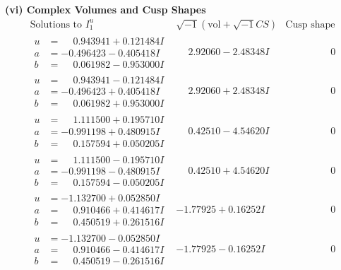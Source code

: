 \documentclass[1p]{elsarticle_modified}
\theoremstyle{definition}
\newcommand{\I}{\sqrt{-1}}
\begin{document}
\newpage\flushleft \textbf{(vi) Complex Volumes and Cusp Shapes}
$$\begin{array}{c|c|c}  
\text{Solutions to }I^u_{1}& \I (\text{vol} + \sqrt{-1}CS) & \text{Cusp shape}\\
 \hline 
\begin{aligned}
u &= \phantom{-}0.943941 + 0.121484 I \\
a &= -0.496423 - 0.405418 I \\
b &= \phantom{-}0.061982 - 0.953000 I\end{aligned}
 & \phantom{-}2.92060 - 2.48348 I & \phantom{-0.000000 } 0 \\ \hline\begin{aligned}
u &= \phantom{-}0.943941 - 0.121484 I \\
a &= -0.496423 + 0.405418 I \\
b &= \phantom{-}0.061982 + 0.953000 I\end{aligned}
 & \phantom{-}2.92060 + 2.48348 I & \phantom{-0.000000 } 0 \\ \hline\begin{aligned}
u &= \phantom{-}1.111500 + 0.195710 I \\
a &= -0.991198 + 0.480915 I \\
b &= \phantom{-}0.157594 + 0.050205 I\end{aligned}
 & \phantom{-}0.42510 - 4.54620 I & \phantom{-0.000000 } 0 \\ \hline\begin{aligned}
u &= \phantom{-}1.111500 - 0.195710 I \\
a &= -0.991198 - 0.480915 I \\
b &= \phantom{-}0.157594 - 0.050205 I\end{aligned}
 & \phantom{-}0.42510 + 4.54620 I & \phantom{-0.000000 } 0 \\ \hline\begin{aligned}
u &= -1.132700 + 0.052850 I \\
a &= \phantom{-}0.910466 + 0.414617 I \\
b &= \phantom{-}0.450519 + 0.261516 I\end{aligned}
 & -1.77925 + 0.16252 I & \phantom{-0.000000 } 0 \\ \hline\begin{aligned}
u &= -1.132700 - 0.052850 I \\
a &= \phantom{-}0.910466 - 0.414617 I \\
b &= \phantom{-}0.450519 - 0.261516 I\end{aligned}
 & -1.77925 - 0.16252 I & \phantom{-0.000000 } 0 \\ \hline\begin{aligned}

\end{aligned}
\end{array}$$
\end{document}
